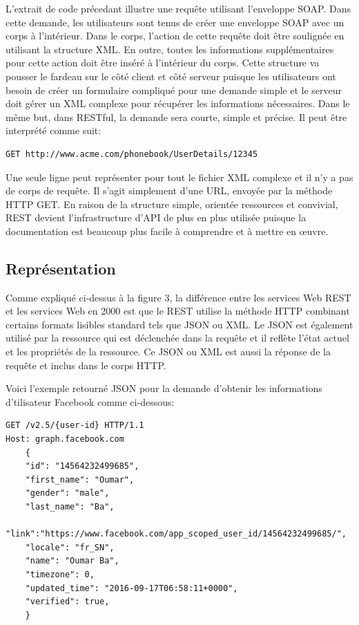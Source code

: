 L'extrait de code précedant illustre une requête utilisant l'enveloppe SOAP. Dans cette demande, les utilisateurs sont tenus de créer une enveloppe SOAP avec un corps à l'intérieur. Dans le corps, l'action de cette requête doit être soulignée en utilisant la structure XML. En outre, toutes les informations supplémentaires pour cette action doit être inséré à l'intérieur du corps. Cette structure va pousser le fardeau sur le côté client et côté serveur puisque les utilisateurs ont besoin de créer un formulaire compliqué pour une demande simple et le serveur doit gérer un XML complexe pour récupérer les informations nécessaires. Dans le même but, dans RESTful, la demande sera courte, simple et précise. Il peut être interprété comme suit:
\begin{verbatim}
GET http://www.acme.com/phonebook/UserDetails/12345
\end{verbatim}

Une seule ligne peut représenter pour tout le fichier XML complexe et il n'y a pas de corps de requête. Il s'agit simplement d'une URL, envoyée par la méthode HTTP GET. En raison de la structure simple, orientée ressources et convivial, REST devient l'infrastructure d'API de plus en plus utilisée puisque la documentation est beaucoup plus facile à comprendre et à mettre en œuvre.

\subsection{Représentation}
Comme expliqué ci-dessus à la figure 3, la différence entre les services Web REST et les services Web en 2000 est que le REST utilise la méthode HTTP combinant certains formats lisibles standard tels que JSON ou XML. Le JSON est également utilisé par la ressource qui est déclenchée dans la requête et il reflète l'état actuel et les propriétés de la ressource. Ce JSON ou XML est aussi la réponse de la requête et inclus dans le corps HTTP.

Voici l'exemple retourné JSON pour la demande d'obtenir les informations d'tilisateur Facebook comme ci-dessous:
\begin{verbatim}
GET /v2.5/{user-id} HTTP/1.1
Host: graph.facebook.com
	{
	"id": "14564232499685", 
	"first_name": "Oumar", 
	"gender": "male", 
	"last_name": "Ba", 
	"link":"https://www.facebook.com/app_scoped_user_id/14564232499685/", 
	"locale": "fr_SN",
	"name": "Oumar Ba",
	"timezone": 0,
	"updated_time": "2016-09-17T06:58:11+0000",
	"verified": true, 
	}
\end{verbatim}

